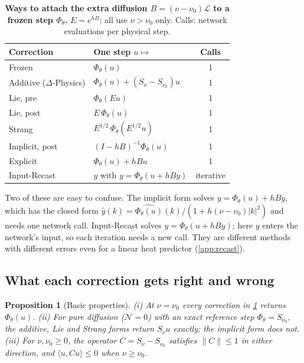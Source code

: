 \documentclass{article}
\theoremstyle{plain}
\newtheorem{proposition}{Proposition}
\newcommand{\dphys}{$\Delta$-Physics\xspace}
\newcommand{\N}{\mathcal{N}}
\newcommand{\Lop}{\mathcal{L}}
\begin{document}
\begin{table}[t]
\caption{\textbf{Ways to attach the extra diffusion $B=(\nu-\nu_0)\Lop$ to a frozen step $\Phi_\theta$.} $E=e^{hB}$; all use $\nu>\nu_0$ only. Calls: network evaluations per physical step.}
\label{tab:corrections}
\centering
\small
\setlength{\tabcolsep}{4pt}
\begin{tabular}{@{}l l c@{}}
\toprule
Correction & One step $u\mapsto$ & Calls \\
\midrule
Frozen & $\Phi_\theta(u)$ & 1 \\
Additive (\dphys) & $\Phi_\theta(u)+(S_\nu-S_{\nu_0})u$ & 1 \\
Lie, pre & $\Phi_\theta(Eu)$ & 1 \\
Lie, post & $E\,\Phi_\theta(u)$ & 1 \\
Strang & $E^{1/2}\,\Phi_\theta(E^{1/2}u)$ & 1 \\
Implicit, post & $(I-hB)^{-1}\Phi_\theta(u)$ & 1 \\
\midrule
Explicit & $\Phi_\theta(u)+hBu$ & 1 \\
Input-Recast & $y$ with $y=\Phi_\theta(u+hBy)$ & iterative \\
\bottomrule
\end{tabular}
\end{table}

Two of these are easy to confuse.
The implicit form solves $y=\Phi_\theta(u)+hBy$, which has the closed form $\hat y(k)=\widehat{\Phi_\theta(u)}(k)/(1+h(\nu-\nu_0)|k|^2)$ and needs one network call.
Input-Recast solves $y=\Phi_\theta(u+hBy)$; here $y$ enters the network's input, so each iteration needs a new call.
They are different methods with different errors even for a linear heat predictor (\cref{app:recast}).

\subsection{What each correction gets right and wrong}
\label{sec:theory}

\begin{proposition}[Basic properties]
\label{prop:properties}
(i) At $\nu=\nu_0$ every correction in \cref{tab:corrections} returns $\Phi_\theta(u)$.
(ii) For pure diffusion ($\N=0$) with an exact reference step $\Phi_\theta=S_{\nu_0}$, the additive, Lie and Strang forms return $S_\nu u$ exactly; the implicit form does not.
(iii) For $\nu,\nu_0\ge0$, the operator $C=S_\nu-S_{\nu_0}$ satisfies $\|C\|\le1$ in either direction, and $\langle u,Cu\rangle\le0$ when $\nu\ge\nu_0$.
\end{proposition}
\end{document}
